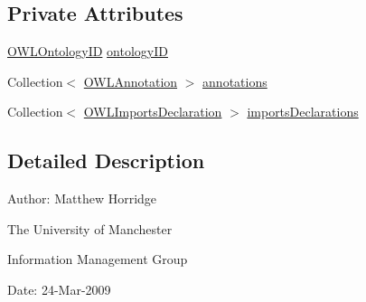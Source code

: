 \subsection*{Private Attributes}
\begin{DoxyCompactItemize}
\item 
\hyperlink{classorg_1_1semanticweb_1_1owlapi_1_1model_1_1_o_w_l_ontology_i_d}{O\-W\-L\-Ontology\-I\-D} \hyperlink{classorg_1_1coode_1_1owlapi_1_1manchesterowlsyntax_1_1_manchester_o_w_l_syntax_ontology_header_a6d7dde5caf2e1e00b1b51bb643d5f8ad}{ontology\-I\-D}
\item 
Collection$<$ \hyperlink{interfaceorg_1_1semanticweb_1_1owlapi_1_1model_1_1_o_w_l_annotation}{O\-W\-L\-Annotation} $>$ \hyperlink{classorg_1_1coode_1_1owlapi_1_1manchesterowlsyntax_1_1_manchester_o_w_l_syntax_ontology_header_ad912cd8ff52ab96a13e61d653a071bd1}{annotations}
\item 
Collection$<$ \hyperlink{interfaceorg_1_1semanticweb_1_1owlapi_1_1model_1_1_o_w_l_imports_declaration}{O\-W\-L\-Imports\-Declaration} $>$ \hyperlink{classorg_1_1coode_1_1owlapi_1_1manchesterowlsyntax_1_1_manchester_o_w_l_syntax_ontology_header_af698d9427444ab8ecd5796054ba7a158}{imports\-Declarations}
\end{DoxyCompactItemize}


\subsection{Detailed Description}
Author\-: Matthew Horridge\par
 The University of Manchester\par
 Information Management Group\par
 Date\-: 24-\/\-Mar-\/2009 

